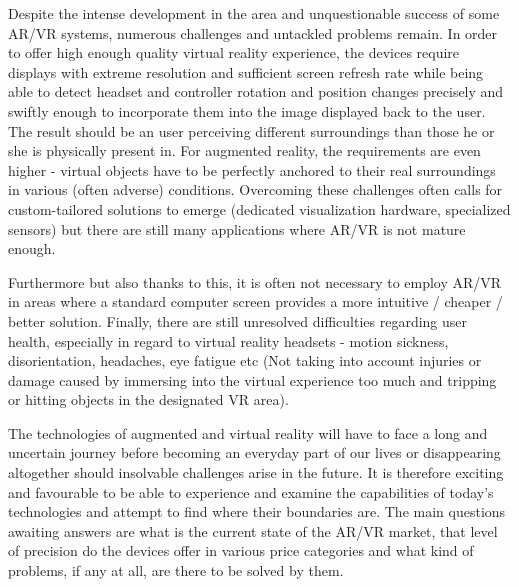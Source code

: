 \documentclass[12pt, a4paper]{article}
\begin{document}
Despite the intense development in the area and unquestionable success of some AR/VR systems, numerous challenges and untackled problems remain. In order to offer high enough quality virtual reality experience, the devices require displays with extreme resolution and sufficient screen refresh rate while being able to detect headset and controller rotation and position changes precisely and swiftly enough to incorporate them into the image displayed back to the user. The result should be an user perceiving different surroundings than those he or she is physically present in. For augmented reality, the requirements are even higher - virtual objects have to be perfectly anchored to their real surroundings in various (often adverse) conditions. Overcoming these challenges often calls for custom-tailored solutions to emerge (dedicated visualization hardware, specialized sensors) but there are still many applications where AR/VR is not mature enough. 

Furthermore but also thanks to this, it is often not necessary to employ AR/VR in areas where a standard computer screen provides a more intuitive / cheaper / better solution. Finally, there are still unresolved difficulties regarding user health, especially in regard to virtual reality headsets - motion sickness, disorientation, headaches, eye fatigue etc (Not taking into account injuries or damage caused by immersing into the virtual experience too much and tripping or hitting objects in the designated VR area).

The technologies of augmented and virtual reality will have to face a long and uncertain journey before becoming an everyday part of our lives or disappearing altogether should insolvable challenges arise in the future. It is therefore exciting and favourable to be able to experience and examine the capabilities of today’s technologies and attempt to find where their boundaries are. The main questions awaiting answers are what is the current state of the AR/VR market, that level of precision do the devices offer in various price categories and what kind of problems, if any at all, are there to be solved by them.
\end{document}
